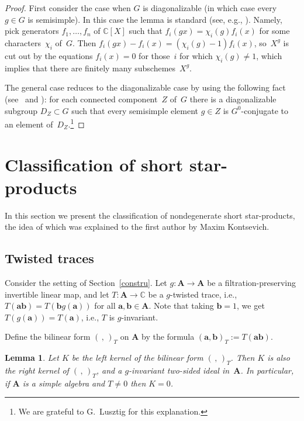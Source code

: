 \documentclass[pdftex]{sigma}
\numberwithin{equation}{section}
\newtheorem{Lemma}[Theorem]{Lemma}
\begin{document}
\begin{proof} First consider the case when $G$ is diagonalizable (in which case every $g\in G$ is semisimple). In this case the lemma is standard (see, e.g., \cite[Proposition on p.~44]{Ste}). Namely, pick generators $f_1,\dots,f_n$ of ${\mathbb C}[X]$ such that $f_i(gx)=\chi_i(g)f_i(x)$ for some characters~$\chi_i$ of~$G$. Then $f_i(gx)-f_i(x)=(\chi_i(g)-1)f_i(x)$, so~$X^g$ is cut out by the equations $f_i(x)=0$ for those~$i$ for which $\chi_i(g)\ne 1$, which implies that there are finitely many subschemes~$X^g$.

The general case reduces to the diagonalizable case by using the following fact (see~\cite{Sie} and \cite[Section~1.14]{Lu}): for each connected component~$Z$ of~$G$ there is a diagonalizable subgroup $D_Z\subset G$ such that every semisimple element $g\in Z$ is $G^0$-conjugate to an element of~$D_Z$.\footnote{We are grateful to G.~Lusztig for this explanation.}
\end{proof}

\section{Classification of short star-products}\label{section3}

In this section we present the classification of nondegenerate short star-products, the idea of which was explained to the first author by Maxim Kontsevich.

\subsection{Twisted traces}

Consider the setting of Section~\ref{constru}. Let $g\colon {{\mathbf A}}\to {{\mathbf A}}$ be a filtration-preserving invertible linear map, and let $T\colon {{\mathbf A}}\to {\mathbb C}$ be a $g$-twisted trace, i.e., $T({\mathbf a}{\mathbf b})=T({\mathbf b}g({\mathbf a}))$ for all ${\mathbf a},{\mathbf b}\in {{\mathbf A}}$. Note that taking ${\mathbf b}=1$, we get $T(g({\mathbf a}))=T({\mathbf a})$, i.e., $T$ is $g$-invariant.

Define the bilinear form $(\,,\,)_T$ on ${\mathbf A}$ by the formula $({\mathbf a},{\mathbf b})_T:=T({\mathbf a}{\mathbf b})$.

\begin{Lemma}\label{ide} Let $K$ be the left kernel of the bilinear form $(\,,\,)_T$. Then $K$ is also the right kernel of $(\,,\,)_T$, and a $g$-invariant two-sided ideal in~${{\mathbf A}}$. In particular, if ${\mathbf A}$ is a simple algebra and $T\ne 0$ then $K=0$.
\end{Lemma}
\end{document}
